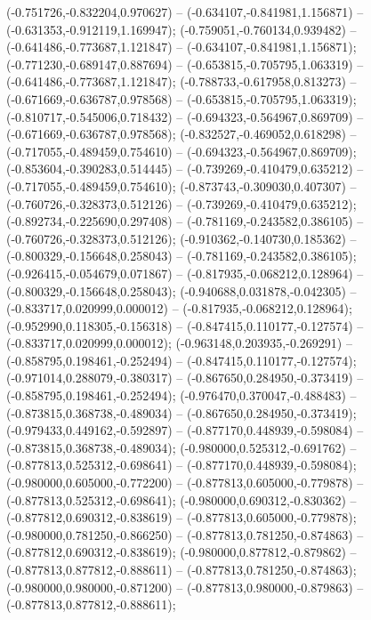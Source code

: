  (-0.751726,-0.832204,0.970627) -- (-0.634107,-0.841981,1.156871) -- (-0.631353,-0.912119,1.169947);
 (-0.759051,-0.760134,0.939482) -- (-0.641486,-0.773687,1.121847) -- (-0.634107,-0.841981,1.156871);
 (-0.771230,-0.689147,0.887694) -- (-0.653815,-0.705795,1.063319) -- (-0.641486,-0.773687,1.121847);
 (-0.788733,-0.617958,0.813273) -- (-0.671669,-0.636787,0.978568) -- (-0.653815,-0.705795,1.063319);
 (-0.810717,-0.545006,0.718432) -- (-0.694323,-0.564967,0.869709) -- (-0.671669,-0.636787,0.978568);
 (-0.832527,-0.469052,0.618298) -- (-0.717055,-0.489459,0.754610) -- (-0.694323,-0.564967,0.869709);
 (-0.853604,-0.390283,0.514445) -- (-0.739269,-0.410479,0.635212) -- (-0.717055,-0.489459,0.754610);
 (-0.873743,-0.309030,0.407307) -- (-0.760726,-0.328373,0.512126) -- (-0.739269,-0.410479,0.635212);
 (-0.892734,-0.225690,0.297408) -- (-0.781169,-0.243582,0.386105) -- (-0.760726,-0.328373,0.512126);
 (-0.910362,-0.140730,0.185362) -- (-0.800329,-0.156648,0.258043) -- (-0.781169,-0.243582,0.386105);
 (-0.926415,-0.054679,0.071867) -- (-0.817935,-0.068212,0.128964) -- (-0.800329,-0.156648,0.258043);
 (-0.940688,0.031878,-0.042305) -- (-0.833717,0.020999,0.000012) -- (-0.817935,-0.068212,0.128964);
 (-0.952990,0.118305,-0.156318) -- (-0.847415,0.110177,-0.127574) -- (-0.833717,0.020999,0.000012);
 (-0.963148,0.203935,-0.269291) -- (-0.858795,0.198461,-0.252494) -- (-0.847415,0.110177,-0.127574);
 (-0.971014,0.288079,-0.380317) -- (-0.867650,0.284950,-0.373419) -- (-0.858795,0.198461,-0.252494);
 (-0.976470,0.370047,-0.488483) -- (-0.873815,0.368738,-0.489034) -- (-0.867650,0.284950,-0.373419);
 (-0.979433,0.449162,-0.592897) -- (-0.877170,0.448939,-0.598084) -- (-0.873815,0.368738,-0.489034);
 (-0.980000,0.525312,-0.691762) -- (-0.877813,0.525312,-0.698641) -- (-0.877170,0.448939,-0.598084);
 (-0.980000,0.605000,-0.772200) -- (-0.877813,0.605000,-0.779878) -- (-0.877813,0.525312,-0.698641);
 (-0.980000,0.690312,-0.830362) -- (-0.877812,0.690312,-0.838619) -- (-0.877813,0.605000,-0.779878);
 (-0.980000,0.781250,-0.866250) -- (-0.877813,0.781250,-0.874863) -- (-0.877812,0.690312,-0.838619);
 (-0.980000,0.877812,-0.879862) -- (-0.877813,0.877812,-0.888611) -- (-0.877813,0.781250,-0.874863);
 (-0.980000,0.980000,-0.871200) -- (-0.877813,0.980000,-0.879863) -- (-0.877813,0.877812,-0.888611);
